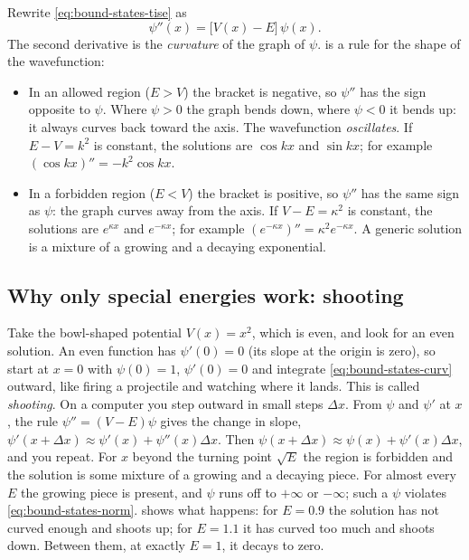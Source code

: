 Rewrite \cref{eq:bound-states-tise} as
\begin{equation}
\psi''(x)=\bigl[V(x)-E\bigr]\,\psi(x).
\label{eq:bound-states-curv}
\end{equation}
The second derivative is the \emph{curvature} of the graph of $\psi$.  is a rule for the shape of the wavefunction:
\begin{itemize}
\item In an allowed region ($E>V$) the bracket is negative, so $\psi''$ has the sign opposite to $\psi$. Where $\psi>0$ the graph bends down, where $\psi<0$ it bends up: it always curves back toward the axis. The wavefunction \emph{oscillates}. If $E-V=k^2$ is constant, the solutions are $\cos kx$ and $\sin kx$; for example $(\cos kx)''=-k^2\cos kx$.
\item In a forbidden region ($E<V$) the bracket is positive, so $\psi''$ has the same sign as $\psi$: the graph curves away from the axis. If $V-E=\kappa^2$ is constant, the solutions are $e^{\kappa x}$ and $e^{-\kappa x}$; for example $(e^{-\kappa x})''=\kappa^2 e^{-\kappa x}$. A generic solution is a mixture of a growing and a decaying exponential.
\end{itemize}

\subsection{Why only special energies work: shooting}

Take the bowl-shaped potential $V(x)=x^2$, which is even, and look for an even solution. An even function has $\psi'(0)=0$ (its slope at the origin is zero), so start at $x=0$ with $\psi(0)=1$, $\psi'(0)=0$ and integrate \cref{eq:bound-states-curv} outward, like firing a projectile and watching where it lands. This is called \emph{shooting}. On a computer you step outward in small steps $\Delta x$. From $\psi$ and $\psi'$ at $x$, the rule $\psi''=(V-E)\psi$ gives the change in slope, $\psi'(x+\Delta x)\approx\psi'(x)+\psi''(x)\Delta x$. Then $\psi(x+\Delta x)\approx\psi(x)+\psi'(x)\Delta x$, and you repeat. For $x$ beyond the turning point $\sqrt E$ the region is forbidden and the solution is some mixture of a growing and a decaying piece. For almost every $E$ the growing piece is present, and $\psi$ runs off to $+\infty$ or $-\infty$; such a $\psi$ violates \cref{eq:bound-states-norm}.  shows what happens: for $E=0.9$ the solution has not curved enough and shoots up; for $E=1.1$ it has curved too much and shoots down. Between them, at exactly $E=1$, it decays to zero.

